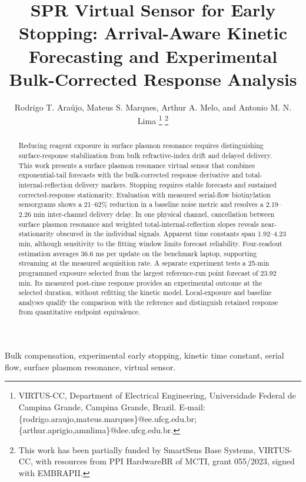 \documentclass[lettersize,journal]{IEEEtran}
\begin{document}
\title{SPR Virtual Sensor for Early Stopping: Arrival-Aware Kinetic Forecasting and Experimental Bulk-Corrected Response Analysis}
\author{Rodrigo T. Ara\'ujo, Mateus S. Marques,
Arthur A. Melo, and Antonio M. N. Lima
\thanks{\raggedright VIRTUS-CC, Department of Electrical Engineering, Universidade Federal de
Campina Grande, Campina Grande, Brazil. E-mail:
\{rodrigo.araujo,mateus.marques\}@ee.ufcg.edu.br;
\{arthur.aprigio,amnlima\}@dee.ufcg.edu.br.}
\thanks{\raggedright This work has been partially funded by SmartSens Base Systems,
VIRTUS-CC, with resources from PPI HardwareBR of MCTI, grant 055/2023,
signed with EMBRAPII.}}


\maketitle

\begin{abstract}
Reducing reagent exposure in surface plasmon resonance requires
distinguishing surface-response stabilization from bulk refractive-index
drift and delayed delivery. This work presents a surface plasmon resonance virtual sensor that
combines exponential-tail forecasts with the bulk-corrected response
derivative and total-internal-reflection delivery markers.
Stopping requires stable forecasts and sustained corrected-response
stationarity. Evaluation with measured serial-flow
biotinylation sensorgrams shows a 21--62\% reduction in a baseline noise
metric and resolves a 2.19--2.26 min inter-channel delivery delay.
In one physical channel, cancellation between surface plasmon resonance and weighted total-internal-reflection slopes
reveals near-stationarity obscured in the individual signals.
Apparent time constants span 1.92--4.23 min, although sensitivity to the
fitting window limits forecast reliability.
Four-readout estimation averages 36.6 ms per update on the benchmark laptop,
supporting streaming at the measured acquisition rate. A separate
experiment tests a 25-min programmed exposure selected from the largest
reference-run point forecast of 23.92 min. Its measured post-rinse response
provides an experimental outcome at the selected duration, without
refitting the kinetic model. Local-exposure and baseline analyses qualify
the comparison with the reference and distinguish retained response from
quantitative endpoint equivalence.
\end{abstract}
\begin{IEEEkeywords}
Bulk compensation, experimental early stopping, kinetic time constant,
serial flow, surface plasmon resonance, virtual sensor.
\end{IEEEkeywords}
\end{document}
